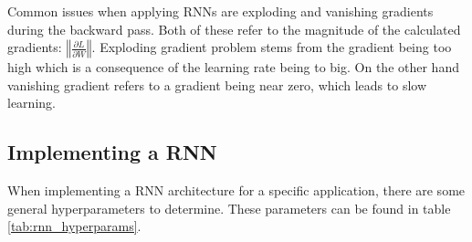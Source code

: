 Common issues when applying RNNs are exploding and vanishing gradients during the backward pass. Both of these refer to the magnitude of the calculated gradients: $\left\Vert \frac{\partial L}{\partial W} \right\Vert$. Exploding gradient problem stems from the gradient being too high which is a consequence of the learning rate being to big. On the other hand vanishing gradient refers to a gradient being near zero, which leads to slow learning. 

\subsection{Implementing a RNN}

When implementing a RNN architecture for a specific application, there are some general hyperparameters to determine. These parameters can be found in table \ref{tab:rnn_hyperparams}.

